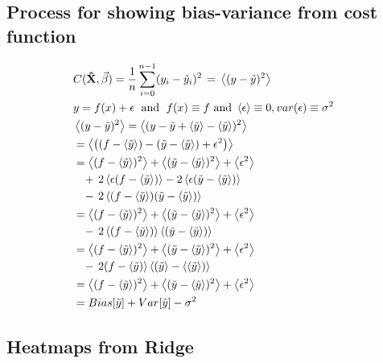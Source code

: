 \documentclass[ 12pt, a4paper ]{article}
\begin{document}
\subsection{Process for showing bias-variance from cost function}
\begin{align}
    & C(\mathbf{\hat{X}}, \vec{\beta}) 
         = \frac{1}{n} \sum_{i=0}^{n-1}(y_i - \tilde{y}_i)^2
         \,=\, \ev{(y- \tilde{y})^2} &\\
    & y = f(x) + \epsilon \;\text{ and }\; f(x) \equiv f 
     \text{ and } \ev{\epsilon} \equiv 0, var(\epsilon)\equiv \sigma^2 &\nonumber \\
    & \ev{(y- \tilde{y})^2} = \ev{(y - \tilde{y} + \ev{\tilde{y}} - \ev{\tilde{y}})^2}
        & \nonumber \\
    & = \ev{ \qty( (f-\ev{\tilde{y}}) - (\tilde{y} - \ev{\tilde{y}}) + \epsilon^2 ) } 
        & \nonumber \\
    & = \ev{ (f-\ev{\tilde{y}})^2 }+ \ev{(\tilde{y} - \ev{\tilde{y}})^2} + \ev{\epsilon^2}
        & \nonumber\\
    &\;\;\;+\, 2\ev{\epsilon(f-\ev{\tilde{y}})} - 2\ev{\epsilon(\tilde{y} - \ev{\tilde{y}})}
         & \nonumber \\
    &\;\;\;-\, 2\ev{(f-\ev{\tilde{y}})(\tilde{y} - \ev{\tilde{y}}) } &\nonumber \\
    & = \ev{ (f-\ev{\tilde{y}})^2 }+ \ev{(\tilde{y} - \ev{\tilde{y}})^2} + \ev{\epsilon^2}
        & \nonumber\\
    &\;\;\;-\, 2\ev{(f-\ev{\tilde{y}})}\ev{(\tilde{y} - \ev{\tilde{y}})}
        & \nonumber\\
    & = \ev{ (f-\ev{\tilde{y}})^2 }+ \ev{(\tilde{y} - \ev{\tilde{y}})^2} + \ev{\epsilon^2}
        & \nonumber\\
    &\;\;\;-\, 2(f-\ev{\tilde{y})}\ev{(\tilde{y}} - \ev{\ev{\tilde{y}})}
        & \nonumber \\
    & = \ev{ (f-\ev{\tilde{y}})^2 }+ \ev{(\tilde{y} - \ev{\tilde{y}})^2} + \ev{\epsilon^2}
        & \nonumber\\
    & = Bias[\tilde{y}] + Var[\tilde{y}] - \sigma^2
\end{align}

\subsection{Heatmaps from Ridge}
\end{document}
